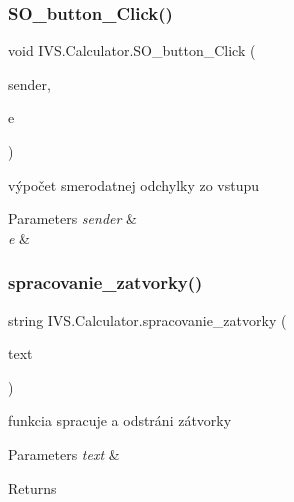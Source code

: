 \subsubsection{\texorpdfstring{S\+O\+\_\+button\+\_\+\+Click()}{SO\_button\_Click()}}
{\footnotesize\ttfamily void I\+V\+S.\+Calculator.\+S\+O\+\_\+button\+\_\+\+Click (\begin{DoxyParamCaption}\item[{object}]{sender,  }\item[{Event\+Args}]{e }\end{DoxyParamCaption})\hspace{0.3cm}{\ttfamily [protected]}}



výpočet smerodatnej odchylky zo vstupu 


\begin{DoxyParams}{Parameters}
{\em sender} & \\
\hline
{\em e} & \\
\hline
\end{DoxyParams}
\mbox{\label{class_i_v_s_1_1_calculator_a9c56e5c59d73fbc0bd4db45dc8beb466}} 
\subsubsection{\texorpdfstring{spracovanie\+\_\+zatvorky()}{spracovanie\_zatvorky()}}
{\footnotesize\ttfamily string I\+V\+S.\+Calculator.\+spracovanie\+\_\+zatvorky (\begin{DoxyParamCaption}\item[{string}]{text }\end{DoxyParamCaption})\hspace{0.3cm}{\ttfamily [protected]}}



funkcia spracuje a odstráni zátvorky 


\begin{DoxyParams}{Parameters}
{\em text} & \\
\hline
\end{DoxyParams}
\begin{DoxyReturn}{Returns}

\end{DoxyReturn}
\mbox{\label{class_i_v_s_1_1_calculator_a0ce50422b2626bc722577bf9e6b31469}} 
